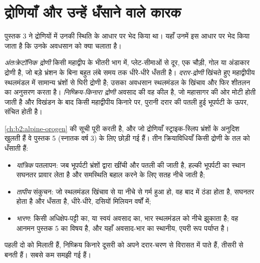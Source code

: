 \section{द्रोणियाँ और उन्हें धँसाने वाले कारक}\label{sec:b2:basins-compared:types}

पुस्तक 3 ने द्रोणियों में उनकी स्थिति के आधार पर भेद किया था। यहाँ उनमें इस आधार पर भेद किया जाता है कि
उनके अवधसान को क्या चलाता है।

\begin{definition}[अंतःक्रेटॉनिक, दरार और निष्क्रिय-किनारा द्रोणियाँ]\label{def:b2:basins-compared:types}
\emph{अंतःक्रेटॉनिक द्रोणी} किसी महाद्वीप के भीतरी भाग में, प्लेट-सीमाओं से दूर,
एक चौड़ी, गोल या अंडाकार द्रोणी है, जो बड़े भ्रंशन के बिना बहुत लंबे समय तक धीरे-धीरे
धँसती है। \emph{दरार-द्रोणी} खिंचते हुए महाद्वीपीय स्थलमंडल में सामान्य भ्रंशों से
घिरी द्रोणी है; उसका अवधसान स्थलमंडल के खिंचाव और फिर
शीतलन का अनुसरण करता है। \emph{निष्क्रिय-किनारा द्रोणी} अवसाद की वह
कील है, जो महासागर की ओर मोटी होती जाती है और विखंडन के बाद किसी महाद्वीपीय किनारे पर, पुरानी दरार की पतली हुई
भूपर्पटी के ऊपर, संचित होती है।
\end{definition}

\cref{ch:b2:alpine-orogen} की  सूची पूरी करती है, और जो द्रोणियाँ
स्ट्राइक-स्लिप भ्रंशों के अनुदिश खुलती हैं वे पुस्तक 5 (स्नातक वर्ष 3) के लिए छोड़ी गई हैं। तीन क्रियाविधियाँ किसी
द्रोणी के तल को धँसाती हैं:
\begin{itemize}
  \item \emph{यांत्रिक} पतलापन: जब भूपर्पटी भ्रंशों द्वारा खींची और पतली की जाती है, हल्की
        भूपर्पटी का स्थान सघनतर प्रावार लेता है और समस्थिति बहाल करने के लिए सतह नीचे जाती है;
  \item \emph{तापीय} संकुचन: जो स्थलमंडल खिंचाव से या नीचे से गर्म हुआ हो, वह
        बाद में ठंडा होता है, सघनतर होता है और धँसता है, धीरे-धीरे, दसियों मिलियन वर्षों में;
  \item \emph{भारण}: किसी अधिक्षेप-पट्टी का, या स्वयं अवसाद का, भार
        स्थलमंडल को नीचे झुकाता है; वह आनमन पुस्तक 5 का विषय है, और यहाँ अवसाद-भार का
        स्थानीय, एयरी रूप पर्याप्त है।
\end{itemize}
 पहली दो को मिलाती हैं, निष्क्रिय किनारे दूसरी को अपने दरार-चरण से विरासत में पाते हैं,
 तीसरी से बनती हैं।  सबसे कम समझी गई हैं।

